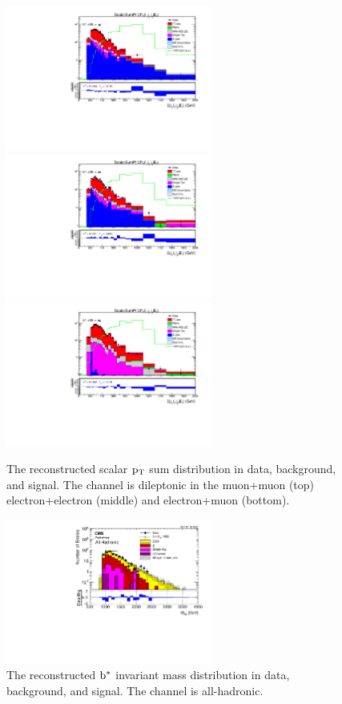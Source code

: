 \begin{figure}[htcb]
\centering
\includegraphics[width=0.6\textwidth]{AN-14-049/figs/ScalarSumPt_nGoodJetslog_mm}
\includegraphics[width=0.6\textwidth]{AN-14-049/figs/ScalarSumPt_nGoodJetslog_ee}
\includegraphics[width=0.6\textwidth]{AN-14-049/figs/ScalarSumPt_nGoodJetslog_em}
\caption{The reconstructed scalar $\mathrm{p_{T}}$ sum distribution in data, background, and signal.  The channel is dileptonic in the muon+muon (top) electron+electron (middle) and electron+muon (bottom). }
\label{figs:bsmtwdilep}
\end{figure}

\begin{figure}[htcb]
\centering
\includegraphics[width=0.6\textwidth]{AN-14-049/figs/MtwvsBkgsemilog_BifPoly_fit.pdf}
\caption{The reconstructed $\mathrm{b}^{*}$ invariant mass distribution in data, background, and signal.  The channel is all-hadronic. }
\label{figs:bsmtwallhad}
\end{figure}

